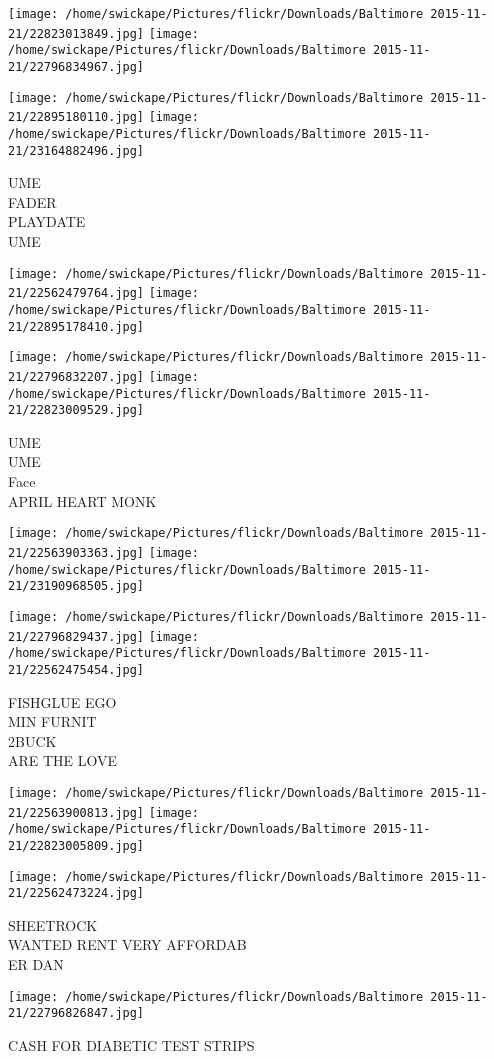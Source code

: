 \documentclass[10pt,letterpaper]{article}
\begin{document}
\texttt{[image: /home/swickape/Pictures/flickr/Downloads/Baltimore 2015-11-21/22823013849.jpg]}
\texttt{[image: /home/swickape/Pictures/flickr/Downloads/Baltimore 2015-11-21/22796834967.jpg]}

\texttt{[image: /home/swickape/Pictures/flickr/Downloads/Baltimore 2015-11-21/22895180110.jpg]}
\texttt{[image: /home/swickape/Pictures/flickr/Downloads/Baltimore 2015-11-21/23164882496.jpg]}

UME\\
FADER\\
PLAYDATE\\
UME\\
\pagebreak

\texttt{[image: /home/swickape/Pictures/flickr/Downloads/Baltimore 2015-11-21/22562479764.jpg]}
\texttt{[image: /home/swickape/Pictures/flickr/Downloads/Baltimore 2015-11-21/22895178410.jpg]}

\texttt{[image: /home/swickape/Pictures/flickr/Downloads/Baltimore 2015-11-21/22796832207.jpg]}
\texttt{[image: /home/swickape/Pictures/flickr/Downloads/Baltimore 2015-11-21/22823009529.jpg]}

UME\\
UME\\
Face\\
APRIL HEART MONK\\
\pagebreak

\texttt{[image: /home/swickape/Pictures/flickr/Downloads/Baltimore 2015-11-21/22563903363.jpg]}
\texttt{[image: /home/swickape/Pictures/flickr/Downloads/Baltimore 2015-11-21/23190968505.jpg]}

\texttt{[image: /home/swickape/Pictures/flickr/Downloads/Baltimore 2015-11-21/22796829437.jpg]}
\texttt{[image: /home/swickape/Pictures/flickr/Downloads/Baltimore 2015-11-21/22562475454.jpg]}

FISHGLUE EGO\\
MIN FURNIT\\
2BUCK\\
ARE THE LOVE\\
\pagebreak

\texttt{[image: /home/swickape/Pictures/flickr/Downloads/Baltimore 2015-11-21/22563900813.jpg]}
\texttt{[image: /home/swickape/Pictures/flickr/Downloads/Baltimore 2015-11-21/22823005809.jpg]}

\texttt{[image: /home/swickape/Pictures/flickr/Downloads/Baltimore 2015-11-21/22562473224.jpg]}

SHEETROCK\\
WANTED RENT VERY AFFORDAB\\
ER DAN\\
\pagebreak

\texttt{[image: /home/swickape/Pictures/flickr/Downloads/Baltimore 2015-11-21/22796826847.jpg]}

CASH FOR DIABETIC TEST STRIPS\\
\pagebreak
\end{document}
